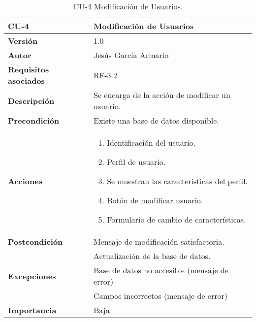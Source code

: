 \begin{table}[p]
	\centering
	\begin{tabularx}{\linewidth}{ p{} p{} }
		\toprule
		\textbf{CU-4}    & \textbf{Modificación de Usuarios}\\
		\toprule
		\textbf{Versión}              & 1.0    \\
		\textbf{Autor}                & Jesús García Armario \\
		\textbf{Requisitos asociados} & RF-3.2 \\
		\textbf{Descripción}          & Se encarga de la acción de modificar un usuario. \\
		\textbf{Precondición}         & Existe una base de datos disponible. \\
		\textbf{Acciones}             &
		\begin{enumerate}
			\def\labelenumi{\arabic{enumi}.}
			\tightlist
			\item Identificación del usuario.
   \item Perfil de usuario.
   \item Se muestran las características del perfil.
   \item Botón de modificar usuario.
   \item Formulario de cambio de características.
\end{enumerate}\\
		\textbf{Postcondición}        &  Mensaje de modificación satisfactoria. \\
  & Actualización de la base de datos.\\
		\textbf{Excepciones}          & Base de datos no accesible (mensaje de error)\\
  & Campos incorrectos (mensaje de error)\\
		\textbf{Importancia}          & Baja \\
		\bottomrule
	\end{tabularx}
	\caption{CU-4 Modificación de Usuarios.}
 \end{table}

 